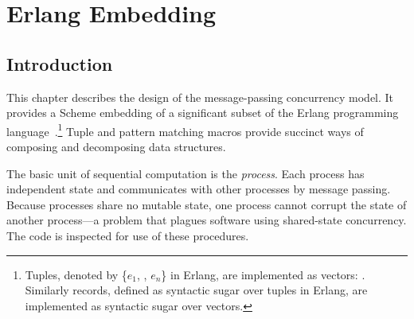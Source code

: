 %
%
%

\chapter {Erlang Embedding}\label{chap:erlang}

\section {Introduction}

This chapter describes the design of the message-passing concurrency
model. It provides a Scheme embedding of a significant subset of the
Erlang programming
language~\cite{armstrong-thesis,programming-erlang}.\footnote{Tuples,
  denoted by \{$e_1$, \etc, $e_n$\} in Erlang, are implemented as
  vectors: . Similarly
  records, defined as syntactic sugar over tuples in Erlang, are
  implemented as syntactic sugar over vectors.}  Tuple and pattern
matching macros provide succinct ways of composing and decomposing
data structures.

The basic unit of sequential computation is the \emph{process}.  Each
process has independent state and communicates with other processes by
message passing. Because processes share no mutable state, one process
cannot corrupt the state of another process---a problem that plagues
software using shared-state concurrency.  \mitigation The code is
inspected for use of these procedures.

